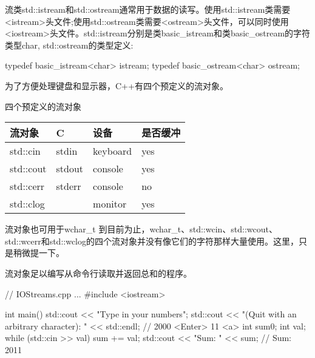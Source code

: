 
流类std::istream和std::ostream通常用于数据的读写。使用std::istream类需要<istream>头文件;使用std::ostream类需要<ostream>头文件，可以同时使用<iostream>头文件。std::istream分别是类basic\_istream和类basic\_ostream的字符类型char, std::ostream的类型定义:

\begin{cpp}
typedef basic_istream<char> istream;
typedef basic_ostream<char> ostream;
\end{cpp}

为了方便处理键盘和显示器，C++有四个预定义的流对象。

\begin{center}
四个预定义的流对象
\end{center}

\begin{longtable}[c]{|l|l|l|l|}
\hline
\textbf{流对象} & \textbf{C} & \textbf{设备} & \textbf{是否缓冲} \\ \hline
\endfirsthead
%
\endhead
%
std::cin               & stdin              & keyboard        & yes               \\ \hline
std::cout              & stdout             & console         & yes               \\ \hline
std::cerr              & stderr             & console         & no                \\ \hline
std::clog              &                    & monitor         & yes               \\ \hline
\end{longtable}


\begin{myNotic}{流对象也可用于wchar\_t}
到目前为止，wchar\_t、std::wcin、std::wcout、std::wcerr和std::wclog的四个流对象并没有像它们的字符那样大量使用。这里，只是稍微提一下。
\end{myNotic}

流对象足以编写从命令行读取并返回总和的程序。


\begin{cpp}
// IOStreams.cpp
...
#include <iostream>

int main(){
	std::cout << "Type in your numbers";
	std::cout << "(Quit with an arbitrary character): " << std::endl;
				// 2000 <Enter> 11 <a>
	int sum{0};
	int val;
	while (std::cin >> val) sum += val;
	std::cout << "Sum: " << sum; // Sum: 2011
}
\end{cpp}

